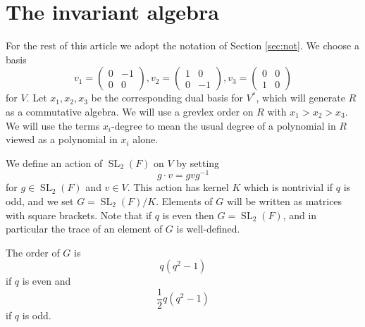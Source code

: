 \documentclass[a4paper]{amsart}
\def\SL{\operatorname{SL}}
\newtheorem*{Corollary of Conjecture}{Corollary of Conjecture}
\theoremstyle{definition}
\theoremstyle{remark}
\theoremstyle{Acknowledgments}
\begin{document}
\section{The invariant algebra}\label{sec:inv}

For the rest of this article we adopt the notation of Section \ref{sec:not}. We choose a basis
\[v_1 = \begin{pmatrix} 0 & -1 \\ 0 & 0 \end{pmatrix}, v_2 =  \begin{pmatrix} 1 & 0 \\ 0 & -1 \end{pmatrix}, v_3 =  \begin{pmatrix} 0 & 0 \\ 1 & 0 \end{pmatrix} \]
for $V$. Let $x_1,x_2,x_3$ be the corresponding dual basis for $V^*$, which will generate $R$ as a commutative algebra.
We will use a grevlex order on $R$ with $x_1>x_2>x_3$. We will use the terms $x_i$-degree to mean the usual degree of a polynomial in $R$ viewed as a polynomial in $x_i$ alone. 

We define an action of $\SL_2(F)$ on $V$ by setting
\[g \cdot v = gvg^{-1}\]
for $g \in \SL_2(F)$ and $v \in V$. This action has kernel $K$ which is nontrivial if $q$ is odd, and we set $G = \SL_2(F)/K$. Elements of $G$ will be written as matrices with square brackets. Note that if $q$ is even then $G = \SL_2(F)$, and in particular the trace of an element of $G$ is well-defined.

The order of $G$ is
\begin{equation}\label{evenorder} q(q^2-1)
\end{equation}
if $q$ is even and
\begin{equation}\label{oddorder} \frac12 q(q^2-1)
\end{equation}
if $q$ is odd.
\end{document}
